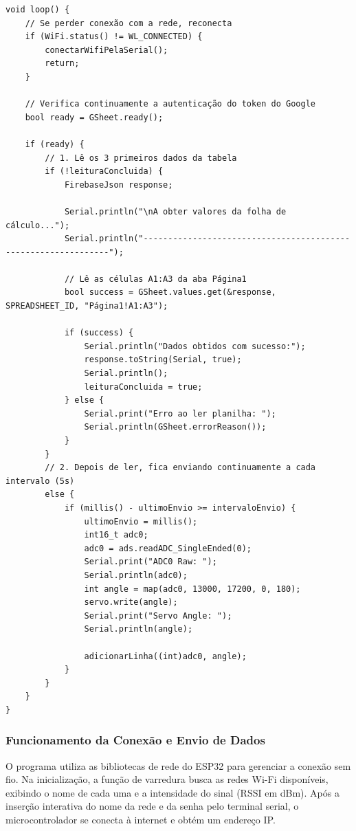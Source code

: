 \documentclass[a4paper,oneside,10pt]{article}
\begin{document}
\begin{lstlisting}[caption={Implementação da varredura Wi-Fi e envio de dados para o Google Sheets no ESP32.}, label={lst:wifi_code}]
void loop() {
	// Se perder conexão com a rede, reconecta
	if (WiFi.status() != WL_CONNECTED) {
		conectarWifiPelaSerial();
		return;
	}
	
	// Verifica continuamente a autenticação do token do Google
	bool ready = GSheet.ready();
	
	if (ready) {
		// 1. Lê os 3 primeiros dados da tabela
		if (!leituraConcluida) {
			FirebaseJson response;
			
			Serial.println("\nA obter valores da folha de cálculo...");
			Serial.println("---------------------------------------------------------------");
			
			// Lê as células A1:A3 da aba Página1
			bool success = GSheet.values.get(&response, SPREADSHEET_ID, "Página1!A1:A3");
			
			if (success) {
				Serial.println("Dados obtidos com sucesso:");
				response.toString(Serial, true);
				Serial.println();
				leituraConcluida = true;
			} else {
				Serial.print("Erro ao ler planilha: ");
				Serial.println(GSheet.errorReason());
			}
		} 
		// 2. Depois de ler, fica enviando continuamente a cada intervalo (5s)
		else {
			if (millis() - ultimoEnvio >= intervaloEnvio) {
				ultimoEnvio = millis();
				int16_t adc0;
				adc0 = ads.readADC_SingleEnded(0);
				Serial.print("ADC0 Raw: ");
				Serial.println(adc0);
				int angle = map(adc0, 13000, 17200, 0, 180);
				servo.write(angle);
				Serial.print("Servo Angle: "); 
				Serial.println(angle);
				
				adicionarLinha((int)adc0, angle);
			}
		}
	}
}
\end{lstlisting}

\subsubsection{Funcionamento da Conexão e Envio de Dados}
O programa utiliza as bibliotecas de rede do ESP32 para gerenciar a conexão sem fio. Na inicialização, a função de varredura busca as redes Wi-Fi disponíveis, exibindo o nome de cada uma e a intensidade do sinal (RSSI em dBm). Após a inserção interativa do nome da rede e da senha pelo terminal serial, o microcontrolador se conecta à internet e obtém um endereço IP.
\end{document}
